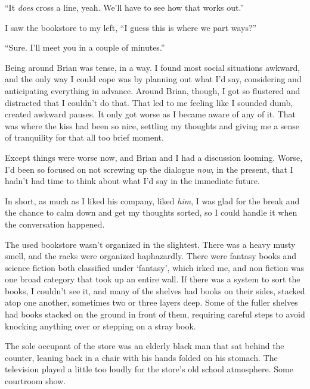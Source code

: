 ``It \emph{does} cross a line, yeah.  We'll have to see how that works out.''



I saw the bookstore to my left, ``I guess this is where we part ways?''



``Sure.  I'll meet you in a couple of minutes.''



Being around Brian was tense, in a way.  I found most social situations awkward, and the only way I could cope was by planning out what I'd say, considering and anticipating everything in advance.  Around Brian, though, I got so flustered and distracted that I couldn't do that.  That led to me feeling like I sounded dumb, created awkward pauses.  It only got worse as I became aware of any of it.  That was where the kiss had been so nice, settling my thoughts and giving me a sense of tranquility for that all too brief moment.



Except things were worse now, and Brian and I had a discussion looming.  Worse, I'd been so focused on not screwing up the dialogue \emph{now}, in the present, that I hadn't had time to think about what I'd say in the immediate future.



In short, as much as I liked his company, liked \emph{him}, I was glad for the break and the chance to calm down and get my thoughts sorted, so I could handle it when the conversation happened.



The used bookstore wasn't organized in the slightest.  There was a heavy musty smell, and the racks were organized haphazardly.  There were fantasy books and science fiction both classified under `fantasy', which irked me, and non fiction was one broad category that took up an entire wall.  If there was a system to sort the books, I couldn't see it, and many of the shelves had books on their sides, stacked atop one another, sometimes two or three layers deep.  Some of the fuller shelves had books stacked on the ground in front of them, requiring careful steps to avoid knocking anything over or stepping on a stray book.



The sole occupant of the store was an elderly black man that sat behind the counter, leaning back in a chair with his hands folded on his stomach.  The television played a little too loudly for the store's old school atmosphere.  Some courtroom show.



